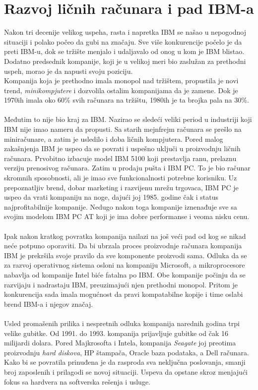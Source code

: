 \documentclass[a4paper]{article}
\begin{document}
\section{Razvoj ličnih računara i pad IBM-a}
Nakon tri decenije velikog uspeha, rasta i napretka IBM se našao u nepogodnoj situaciji i polako počeo da gubi na značaju. %
Sve više konkurencije počelo je da preti IBM-u, dok se tržište menjalo i udaljavalo od onog u kom je IBM blistao. Dodatno predsednik kompanije, koji je u velikoj meri bio zaslužan za prethodni uspeh, morao je da napusti svoju poziciju.\\
Kompanija koja je prethodno imala monopol nad tržištem, propustila je novi trend, \emph{minikompjutere} i dozvolila ostalim kompanijama da je zamene. Dok je 1970ih imala oko 60\% svih računara na tržištu, 1980ih je ta brojka pala na 30\%. %
\\ \\
Međutim to nije bio kraj za IBM. Nazirao se sledeći veliki period u industriji koji IBM nije imao nameru da propusti. Sa starih mejnfrejm računara se prešlo na miniračunare, a zatim je usledilo i doba ličnih kompjutera. Pored malog zakašnjenja IBM je uspeo da se povrati i uspešno uključi u proizvodnju ličnih računara. Prvobitno izbacuje model IBM 5100 koji prestavlja ranu, prelaznu verziju prenosivog računara. Zatim u prodaju pušta i IBM PC. To je bio računar skromnih sposobnosti, ali je imao sve funkcionalnosti potrebne korisniku. Uz prepoznatljiv brend, dobar marketing i razvijenu mrežu trgovaca, IBM PC je uspeo da vrati kompaniju na noge, dajući joj 1985. godine čak i status najprofitabilnije kompanije. Nedugo nakon toga kompanije iznenađuje sve sa svojim modelom IBM PC AT koji je ima dobre performanse i veoma nisku cenu. 
\\ \\
Ipak nakon kratkog povratka kompanija nailazi na još veći pad od kog se nikad neće potpuno oporaviti. %
Da bi ubrzala proces proizvodnje računara kompanija IBM je prekršila svoje pravilo da sve komponente proizvodi sama. Odluka da se za razvoj operativnog sistema osloni na kompaniju Microsoft, a mikroprocesore nabavlja od kompanije Intel biće fatalna po IBM. Obe kompanije počinju da se razvijaju i nadrastaju IBM, preuzimajući njen prethodni monopol. Pritom je konkurencija sada imala mogućnost da pravi kompatabilne kopije i time oslabi brend IBM-a i njegov značaj.\\ \\
Usled promašenih prilika i nespretnih odluka kompanija narednih godina trpi velike gubitke. Od 1991. do 1993. kompanija prijavljuje gubitke od čak 16 milijardi dolara. Pored Majkrosofta i Intela, kompanija \emph{Seagate} joj preotima proizvodnju \emph{hard diskova}, HP štampača, Oracle baza podataka, a Dell računara. \\ 
Kako bi se povratila prinuđena je da rasproda sva neključna poslovanja, smanji broj zaposlenih i prilagodi se novoj situaciji. Uspeva da opstane skroz menjajući fokus sa hardvera na softverska rešenja i usluge.
\end{document}
